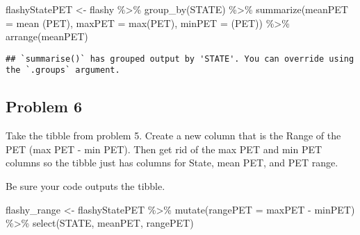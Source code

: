\documentclass[
]{article}
\newenvironment{Shaded}{\begin{snugshade}}{\end{snugshade}}
\newcommand{\AttributeTok}[1]{\textcolor[rgb]{0.77,0.63,0.00}{#1}}
\newcommand{\FunctionTok}[1]{\textcolor[rgb]{0.00,0.00,0.00}{#1}}
\newcommand{\NormalTok}[1]{#1}
\newcommand{\OtherTok}[1]{\textcolor[rgb]{0.56,0.35,0.01}{#1}}
\newcommand{\SpecialCharTok}[1]{\textcolor[rgb]{0.00,0.00,0.00}{#1}}
\begin{document}
\begin{Shaded}
\begin{Highlighting}[]
\NormalTok{flashyStatePET }\OtherTok{\textless{}{-}}\NormalTok{ flashy }\SpecialCharTok{\%\textgreater{}\%}
  \FunctionTok{group\_by}\NormalTok{(STATE) }\SpecialCharTok{\%\textgreater{}\%}
  \FunctionTok{summarize}\NormalTok{(}\AttributeTok{meanPET =} \FunctionTok{mean}\NormalTok{ (PET), }\AttributeTok{maxPET =} \FunctionTok{max}\NormalTok{(PET), }\AttributeTok{minPET =}\NormalTok{ (PET)) }\SpecialCharTok{\%\textgreater{}\%}
  \FunctionTok{arrange}\NormalTok{(meanPET)}
\end{Highlighting}
\end{Shaded}

\begin{verbatim}
## `summarise()` has grouped output by 'STATE'. You can override using the `.groups` argument.
\end{verbatim}

\hypertarget{problem-6}{%
\subsection{Problem 6}\label{problem-6}}

Take the tibble from problem 5. Create a new column that is the Range of
the PET (max PET - min PET). Then get rid of the max PET and min PET
columns so the tibble just has columns for State, mean PET, and PET
range.

Be sure your code outputs the tibble.

\begin{Shaded}
\begin{Highlighting}[]
\NormalTok{flashy\_range }\OtherTok{\textless{}{-}}\NormalTok{ flashyStatePET }\SpecialCharTok{\%\textgreater{}\%}
  \FunctionTok{mutate}\NormalTok{(}\AttributeTok{rangePET =}\NormalTok{ maxPET }\SpecialCharTok{{-}}\NormalTok{ minPET) }\SpecialCharTok{\%\textgreater{}\%}
  \FunctionTok{select}\NormalTok{(STATE, meanPET, rangePET)}
\end{Highlighting}
\end{Shaded}
\end{document}
